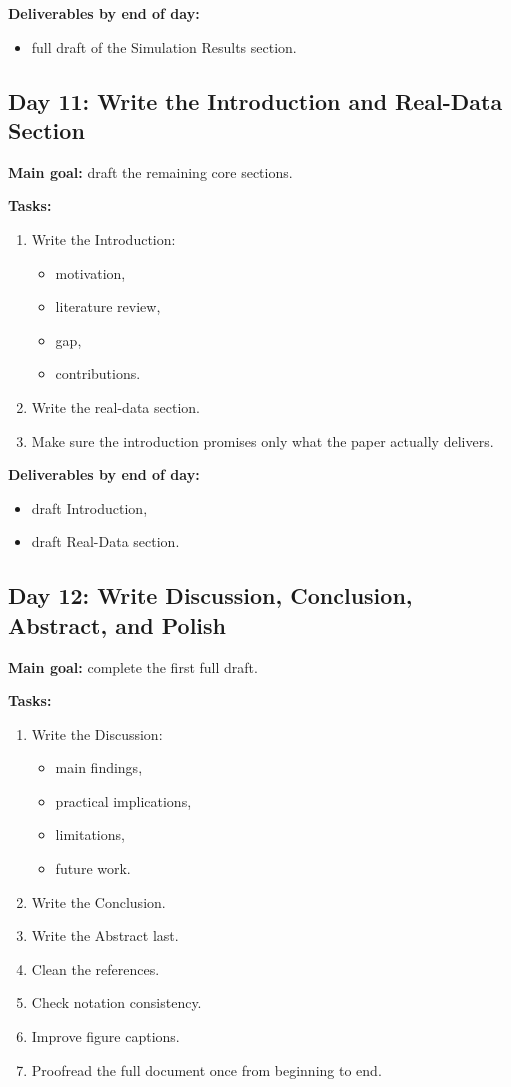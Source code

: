 \documentclass[11pt]{article}
\begin{document}
\textbf{Deliverables by end of day:}
\begin{itemize}
    \item full draft of the Simulation Results section.
\end{itemize}

\subsection*{Day 11: Write the Introduction and Real-Data Section}
\textbf{Main goal:} draft the remaining core sections.

\textbf{Tasks:}
\begin{enumerate}[label=(\arabic*)]
    \item Write the Introduction:
    \begin{itemize}
        \item motivation,
        \item literature review,
        \item gap,
        \item contributions.
    \end{itemize}
    \item Write the real-data section.
    \item Make sure the introduction promises only what the paper actually delivers.
\end{enumerate}

\textbf{Deliverables by end of day:}
\begin{itemize}
    \item draft Introduction,
    \item draft Real-Data section.
\end{itemize}

\subsection*{Day 12: Write Discussion, Conclusion, Abstract, and Polish}
\textbf{Main goal:} complete the first full draft.

\textbf{Tasks:}
\begin{enumerate}[label=(\arabic*)]
    \item Write the Discussion:
    \begin{itemize}
        \item main findings,
        \item practical implications,
        \item limitations,
        \item future work.
    \end{itemize}
    \item Write the Conclusion.
    \item Write the Abstract last.
    \item Clean the references.
    \item Check notation consistency.
    \item Improve figure captions.
    \item Proofread the full document once from beginning to end.
\end{enumerate}
\end{document}
